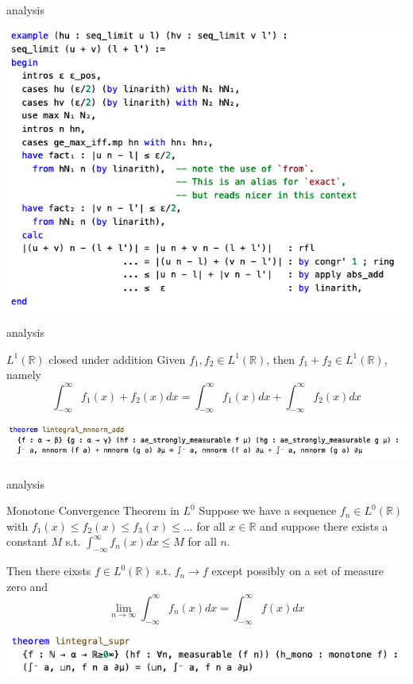 \documentclass{beamer}
\newcommand{\R}{\mathbb{R}}
\begin{document}
\begin{frame}{analysis}
	\begin{center}
		\includegraphics[scale=.4]{seq_limit.jpg}
	\end{center}
\end{frame}

\begin{frame}{analysis}
	\begin{theom}{$L^1(\R)$ closed under addition}{}
	Given $f_1, f_2 \in L^1(\R)$, then $f_1+f_2 \in L^1(\R)$, namely \[
		\int_{-\infty}^{\infty} f_1(x) + f_2(x) dx = \int_{-\infty}^{\infty} f_1(x) dx + \int_{-\infty}^{\infty} f_2(x) dx
	\] 
\end{theom}
\begin{center}
	\includegraphics[scale=.4]{closed.jpg}
\end{center}
\end{frame}

\begin{frame}{analysis}
\begin{theom}{Monotone Convergence Theorem in $L^0$}{}
	Suppose we have a sequence $f_n \in L^0(\R)$ with $f_1(x) \le  f_2(x) \le  f_3(x) \le  \ldots$ for all $x \in \R$ and suppose there exists a constant $M$ s.t.  $\int_{-\infty}^{\infty} f_n(x) dx \le  M$ for all $n$.

	Then there eixsts  $f \in L^0(\R)$ s.t. $f_n \to f$ except possibly on a set of measure zero and \[
		\lim_{n \to \infty} \int_{-\infty}^{\infty} f_n(x) dx = \int_{-\infty}^{\infty} f(x)dx
	\] 
\end{theom}	
\begin{center}
	\includegraphics[scale=.4]{monotone.jpg}
\end{center}
\end{frame}
\end{document}

